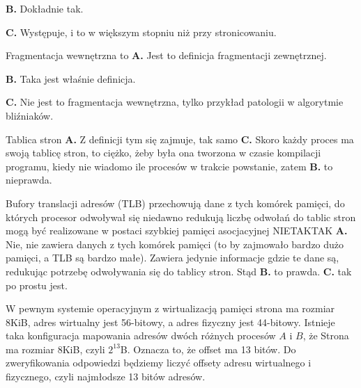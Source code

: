 \begin{solutions}
    \textbf{B.} Dokładnie tak.

    \textbf{C.} Występuje, i to w większym stopniu niż przy stronicowaniu.

    \sol Fragmentacja wewnętrzna to
    \textbf{A.} Jest to definicja fragmentacji zewnętrznej.

    \textbf{B.} Taka jest właśnie definicja.

    \textbf{C.} Nie jest to fragmentacja wewnętrzna, tylko przykład patologii w algorytmie bliźniaków.

    \sol Tablica stron
    \textbf{A.} Z definicji tym się zajmuje, tak samo \textbf{C.} Skoro każdy proces ma swoją tablicę stron, to ciężko, żeby była ona tworzona w czasie kompilacji programu, kiedy nie wiadomo ile procesów w trakcie powstanie, zatem \textbf{B.} to nieprawda.
    
    \sol Bufory translacji adresów (TLB)
    \answerss
    {przechowują dane z tych komórek pamięci, do których procesor odwoływał się niedawno}
    {redukują liczbę odwołań do tablic stron}
    {mogą być realizowane w postaci szybkiej pamięci asocjacyjnej}
    {NIE}{TAK}{TAK}
    \textbf{A.} Nie, nie zawiera danych z tych komórek pamięci (to by zajmowało bardzo dużo pamięci, a TLB są bardzo małe). Zawiera jedynie informacje gdzie te dane są, redukując potrzebę odwoływania się do tablicy stron. Stąd \textbf{B.} to prawda. \textbf{C.} tak po prostu jest.

    \sol W pewnym systemie operacyjnym z wirtualizacją pamięci strona ma rozmiar 8KiB, adres wirtualny jest 56-bitowy, a adres fizyczny jest 44-bitowy. Istnieje taka konfiguracja mapowania adresów dwóch różnych procesów $A$ i $B$, że
    Strona ma rozmiar 8KiB, czyli $2^{13}$B. Oznacza to, że offset ma 13 bitów. Do zweryfikowania odpowiedzi będziemy liczyć offsety adresu wirtualnego i fizycznego, czyli najmłodsze 13 bitów adresów.
    

\end{solutions}
